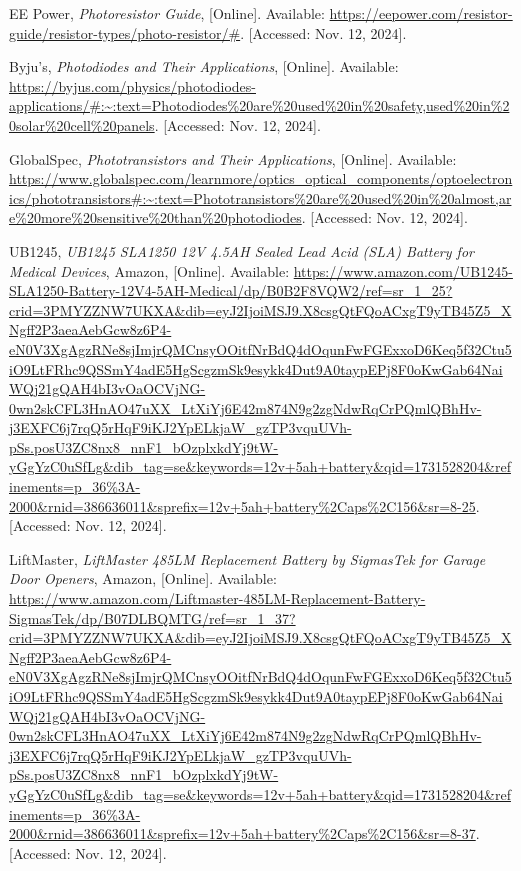 \begin{thebibliography}{45}
	EE Power, \textit{Photoresistor Guide}, [Online]. Available: \url{https://eepower.com/resistor-guide/resistor-types/photo-resistor/#}. [Accessed: Nov. 12, 2024].
	
	Byju's, \textit{Photodiodes and Their Applications}, [Online]. Available: \url{https://byjus.com/physics/photodiodes-applications/#:~:text=Photodiodes%20are%20used%20in%20safety,used%20in%20solar%20cell%20panels}. [Accessed: Nov. 12, 2024].
	
	GlobalSpec, \textit{Phototransistors and Their Applications}, [Online]. Available: \url{https://www.globalspec.com/learnmore/optics_optical_components/optoelectronics/phototransistors#:~:text=Phototransistors%20are%20used%20in%20almost,are%20more%20sensitive%20than%20photodiodes}. [Accessed: Nov. 12, 2024].
	
	UB1245, \textit{UB1245 SLA1250 12V 4.5AH Sealed Lead Acid (SLA) Battery for Medical Devices}, Amazon, [Online]. Available: \url{https://www.amazon.com/UB1245-SLA1250-Battery-12V4-5AH-Medical/dp/B0B2F8VQW2/ref=sr_1_25?crid=3PMYZZNW7UKXA&dib=eyJ2IjoiMSJ9.X8csgQtFQoACxgT9yTB45Z5_XNgff2P3aeaAebGcw8z6P4-eN0V3XgAgzRNe8sjImjrQMCnsyOOitfNrBdQ4dOqunFwFGExxoD6Keq5f32Ctu5iO9LtFRhc9QSSmY4adE5HgScgzmSk9esykk4Dut9A0taypEPj8F0oKwGab64NaiWQj21gQAH4bI3vOaOCVjNG-0wn2skCFL3HnAO47uXX_LtXiYj6E42m874N9g2zgNdwRqCrPQmlQBhHv-j3EXFC6j7rqQ5rHqF9iKJ2YpELkjaW_gzTP3vquUVh-pSs.posU3ZC8nx8_nnF1_bOzplxkdYj9tW-yGgYzC0uSfLg&dib_tag=se&keywords=12v+5ah+battery&qid=1731528204&refinements=p_36%3A-2000&rnid=386636011&sprefix=12v+5ah+battery%2Caps%2C156&sr=8-25}. [Accessed: Nov. 12, 2024].
	
	LiftMaster, \textit{LiftMaster 485LM Replacement Battery by SigmasTek for Garage Door Openers}, Amazon, [Online]. Available: \url{https://www.amazon.com/Liftmaster-485LM-Replacement-Battery-SigmasTek/dp/B07DLBQMTG/ref=sr_1_37?crid=3PMYZZNW7UKXA&dib=eyJ2IjoiMSJ9.X8csgQtFQoACxgT9yTB45Z5_XNgff2P3aeaAebGcw8z6P4-eN0V3XgAgzRNe8sjImjrQMCnsyOOitfNrBdQ4dOqunFwFGExxoD6Keq5f32Ctu5iO9LtFRhc9QSSmY4adE5HgScgzmSk9esykk4Dut9A0taypEPj8F0oKwGab64NaiWQj21gQAH4bI3vOaOCVjNG-0wn2skCFL3HnAO47uXX_LtXiYj6E42m874N9g2zgNdwRqCrPQmlQBhHv-j3EXFC6j7rqQ5rHqF9iKJ2YpELkjaW_gzTP3vquUVh-pSs.posU3ZC8nx8_nnF1_bOzplxkdYj9tW-yGgYzC0uSfLg&dib_tag=se&keywords=12v+5ah+battery&qid=1731528204&refinements=p_36%3A-2000&rnid=386636011&sprefix=12v+5ah+battery%2Caps%2C156&sr=8-37}. [Accessed: Nov. 12, 2024].
	

\end{thebibliography}
